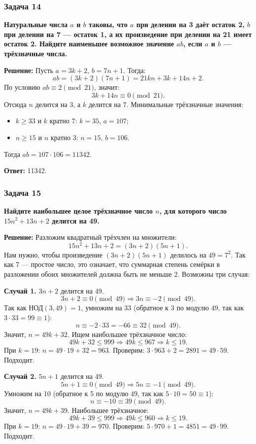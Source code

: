 \documentclass[12pt, a4paper]{article}
\begin{document}
\subsubsection*{Задача 14}
\textbf{Натуральные числа $a$ и $b$ таковы, что $a$ при делении на 3 даёт остаток 2, $b$ при делении на 7 — остаток 1, а их произведение при делении на 21 имеет остаток 2. Найдите наименьшее возможное значение $ab$, если $a$ и $b$ — трёхзначные числа.}

\textbf{Решение:}
Пусть $a = 3k+2$, $b = 7n+1$. Тогда:
\[
ab = (3k+2)(7n+1) = 21kn + 3k + 14n + 2.
\]
По условию $ab \equiv 2 \pmod{21}$, значит:
\[
3k + 14n \equiv 0 \pmod{21}.
\]
Отсюда $n$ делится на 3, а $k$ делится на 7. Минимальные трёхзначные значения:
\begin{itemize}
    \item $k \ge 33$ и $k$ кратно 7: $k = 35$, $a = 107$;
    \item $n \ge 15$ и $n$ кратно 3: $n = 15$, $b = 106$.
\end{itemize}
Тогда $ab = 107 \cdot 106 = 11342$.

\textbf{Ответ:} 11342.

\subsubsection*{Задача 15}
\textbf{Найдите наибольшее целое трёхзначное число $n$, для которого число $15n^2 + 13n + 2$ делится на 49.}

\textbf{Решение:}
Разложим квадратный трёхчлен на множители:
\[
15n^2 + 13n + 2 = (3n + 2)(5n + 1).
\]
Нам нужно, чтобы произведение $(3n + 2)(5n + 1)$ делилось на \(49 = 7^2\). Так как 7 — простое число, это означает, что суммарная степень семёрки в разложении обоих множителей должна быть не меньше 2. Возможны три случая:

\textbf{Случай 1.} $3n + 2$ делится на 49.
\[
3n + 2 \equiv 0 \pmod{49} \Rightarrow 3n \equiv -2 \pmod{49}.
\]
Так как $\text{НОД}(3, 49) = 1$, умножим на 33 (обратное к 3 по модулю 49, так как $3 \cdot 33 = 99 \equiv 1$):
\[
n \equiv -2 \cdot 33 = -66 \equiv 32 \pmod{49}.
\]
Значит, $n = 49k + 32$. Ищем наибольшее трёхзначное число:
\[
49k + 32 \le 999 \Rightarrow 49k \le 967 \Rightarrow k \le 19.
\]
При $k = 19$: $n = 49 \cdot 19 + 32 = 963$. Проверим: $3 \cdot 963 + 2 = 2891 = 49 \cdot 59$. Подходит.

\textbf{Случай 2.} $5n + 1$ делится на 49.
\[
5n + 1 \equiv 0 \pmod{49} \Rightarrow 5n \equiv -1 \pmod{49}.
\]
Умножим на 10 (обратное к 5 по модулю 49, так как $5 \cdot 10 = 50 \equiv 1$):
\[
n \equiv -10 \equiv 39 \pmod{49}.
\]
Значит, $n = 49k + 39$. Наибольшее трёхзначное:
\[
49k + 39 \le 999 \Rightarrow 49k \le 960 \Rightarrow k \le 19.
\]
При $k = 19$: $n = 49 \cdot 19 + 39 = 970$. Проверим: $5 \cdot 970 + 1 = 4851 = 49 \cdot 99$. Подходит.
\end{document}
